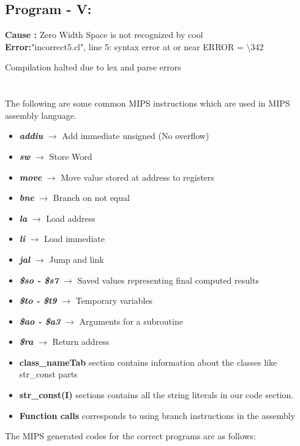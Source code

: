 \documentclass[english,a4paper,12pt]{article}
\begin{document}
\subsection*{\textbf{Program - V}:}
\textbf{Cause :} Zero Width Space is not recognized by cool \\
\textbf{Error:}"incorrect5.cl", line 5: syntax error at or near ERROR = \textbackslash342


\qquad \hspace{1mm}Compilation halted due to lex and parse errors

\newpage

\section*{}
The following are some common MIPS instructions which are used in MIPS assembly language.
\begin{itemize}
    \item \textbf{\textit{addiu}} $\rightarrow$ Add immediate unsigned (No overflow) 
    \item \textbf{\textit{sw}} $\rightarrow$ Store Word
    \item \textbf{\textit{move}} $\rightarrow$ Move value stored at address to registers
    \item \textbf{\textit{bne}} $\rightarrow$ Branch on not equal
    \item \textbf{\textit{la}} $\rightarrow$ Load address
    \item \textbf{\textit{li}} $\rightarrow$ Load immediate
    \item \textbf{\textit{jal}} $\rightarrow$ Jump and link
    \item \textbf{\textit{\$so - \$s7}} $\rightarrow$ Saved values representing final computed results
    \item \textbf{\textit{\$to - \$t9}} $\rightarrow$ Temporary variables
    \item \textbf{\textit{\$ao - \$a3}} $\rightarrow$ Arguments for a subroutine
    \item \textbf{\textit{\$ra}} $\rightarrow$ Return address
    
    \item \textbf{class\_nameTab} section contains information about the classes like str\_const parts
    \item \textbf{str\_const(I)} sections contains all the string literals in our code section.
    \item \textbf{Function calls} corresponds to using branch instructions in the assembly
    
\end{itemize}
       The MIPS generated codes for the correct programs are as follows:
\end{document}
